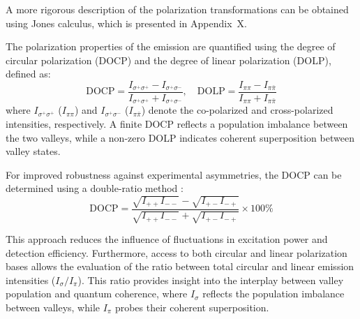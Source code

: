 A more rigorous description of the polarization transformations can be obtained using Jones calculus, which is presented in Appendix~X.

The polarization properties of the emission are quantified using the degree of circular polarization (DOCP) and the degree of linear polarization (DOLP), defined as:
\begin{equation}
    \text{DOCP} = \frac{I_{\sigma^+\sigma^+} - I_{\sigma^+\sigma^-}}{I_{\sigma^+\sigma^+} + I_{\sigma^+\sigma^-}}, \quad
    \text{DOLP} = \frac{I_{\pi\pi} - I_{\pi\bar{\pi}}}{I_{\pi\pi} + I_{\pi\bar{\pi}}}
\end{equation}
where $I_{\sigma^+\sigma^+}$ ($I_{\pi\pi}$) and $I_{\sigma^+\sigma^-}$ ($I_{\pi\bar{\pi}}$) denote the co-polarized and cross-polarized intensities, respectively. A finite DOCP reflects a population imbalance between the two valleys, while a non-zero DOLP indicates coherent superposition between valley states.

For improved robustness against experimental asymmetries, the DOCP can be determined using a double-ratio method \cite{sato-1981}:
\begin{equation}
    \text{DOCP} = \frac{\sqrt{I_{++} I_{--}} - \sqrt{I_{+-} I_{-+}}}{\sqrt{I_{++} I_{--}} + \sqrt{I_{+-} I_{-+}}} \times 100\%
\end{equation}

This approach reduces the influence of fluctuations in excitation power and detection efficiency. Furthermore, access to both circular and linear polarization bases allows the evaluation of the ratio between total circular and linear emission intensities ($I_{\sigma}/I_{\pi}$). This ratio provides insight into the interplay between valley population and quantum coherence, where $I_{\sigma}$ reflects the population imbalance between valleys, while $I_{\pi}$ probes their coherent superposition.


